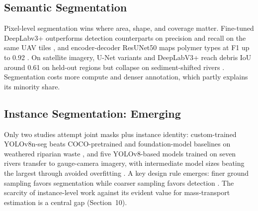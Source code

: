 \subsection{Semantic Segmentation}
Pixel-level segmentation wins where area, shape, and coverage matter. Fine-tuned DeepLabv3+ outperforms detection counterparts on precision and recall on the same UAV tiles \cite{Pati2025}, and encoder-decoder ResUNet50 maps polymer types at F1 up to 0.92 \cite{Jakovljevic2020}. On satellite imagery, U-Net variants and DeepLabV3+ reach debris IoU around 0.61 on held-out regions but collapse on sediment-shifted rivers \cite{SoleGomez2022}. Segmentation costs more compute and denser annotation, which partly explains its minority share.

\subsection{Instance Segmentation: Emerging}
Only two studies attempt joint masks plus instance identity: custom-trained YOLOv8n-seg beats COCO-pretrained and foundation-model baselines on weathered riparian waste \cite{Pan2024}, and five YOLOv8-based models trained on seven rivers transfer to gauge-camera imagery, with intermediate model sizes beating the largest through avoided overfitting \cite{Kataoka2024}. A key design rule emerges: finer ground sampling favors segmentation while coarser sampling favors detection \cite{Kataoka2024}. The scarcity of instance-level work against its evident value for mass-transport estimation is a central gap (Section~10).
